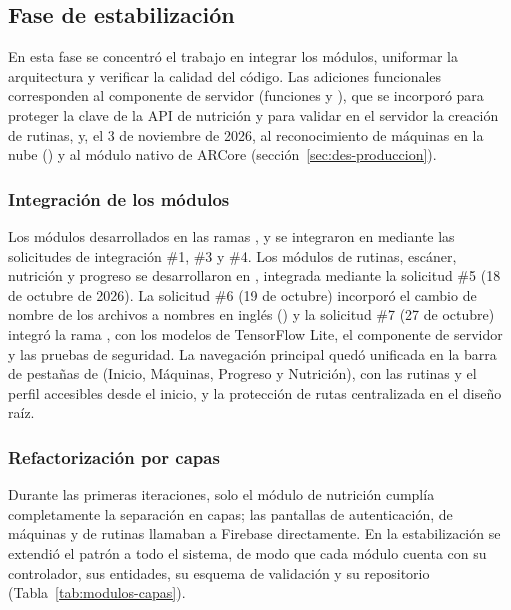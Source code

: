\subsection{Fase de estabilización}
\label{sec:des-estabilizacion}

En esta fase se concentró el trabajo en integrar los módulos, uniformar la
arquitectura y verificar la calidad del código. Las adiciones funcionales
corresponden al componente de servidor (funciones  y
), que se incorporó para proteger la clave de la API de
nutrición y para validar en el servidor la creación de rutinas, y, el 3 de
noviembre de 2026, al reconocimiento de máquinas en la nube
() y al módulo nativo de ARCore
(sección~\ref{sec:des-produccion}).

\subsubsection{Integración de los módulos}

Los módulos desarrollados en las ramas ,
 y  se integraron en
 mediante las solicitudes de integración \#1, \#3 y \#4. Los
módulos de rutinas, escáner, nutrición y progreso se desarrollaron en
, integrada mediante la solicitud \#5 (18 de octubre
de 2026). La solicitud \#6 (19 de octubre) incorporó el cambio de nombre de los
archivos a nombres en inglés () y la
solicitud \#7 (27 de octubre) integró la rama , con los
modelos de TensorFlow Lite, el componente de servidor y las pruebas de
seguridad. La navegación principal quedó unificada en la barra
de pestañas de  (Inicio, Máquinas, Progreso y Nutrición), con
las rutinas y el perfil accesibles desde el inicio, y la protección de rutas
centralizada en el diseño raíz.

\subsubsection{Refactorización por capas}

Durante las primeras iteraciones, solo el módulo de nutrición cumplía
completamente la separación en capas; las pantallas de autenticación, de
máquinas y de rutinas llamaban a Firebase directamente. En la estabilización
se extendió el patrón a todo el sistema, de modo que cada módulo cuenta con su
controlador, sus entidades, su esquema de validación y su repositorio
(Tabla~\ref{tab:modulos-capas}).

